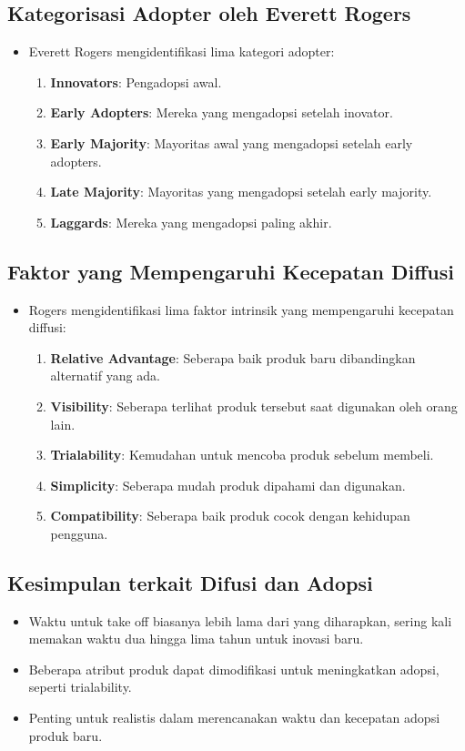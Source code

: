 \documentclass{article}
\begin{document}
\subsection{Kategorisasi Adopter oleh Everett Rogers}
\begin{itemize}
    \item Everett Rogers mengidentifikasi lima kategori adopter:
          \begin{enumerate}
              \item \textbf{Innovators}: Pengadopsi awal.
              \item \textbf{Early Adopters}: Mereka yang mengadopsi setelah inovator.
              \item \textbf{Early Majority}: Mayoritas awal yang mengadopsi setelah early adopters.
              \item \textbf{Late Majority}: Mayoritas yang mengadopsi setelah early majority.
              \item \textbf{Laggards}: Mereka yang mengadopsi paling akhir.
          \end{enumerate}
\end{itemize}

\subsection{Faktor yang Mempengaruhi Kecepatan Diffusi}
\begin{itemize}
    \item Rogers mengidentifikasi lima faktor intrinsik yang mempengaruhi kecepatan diffusi:
          \begin{enumerate}
              \item \textbf{Relative Advantage}: Seberapa baik produk baru dibandingkan alternatif yang ada.
              \item \textbf{Visibility}: Seberapa terlihat produk tersebut saat digunakan oleh orang lain.
              \item \textbf{Trialability}: Kemudahan untuk mencoba produk sebelum membeli.
              \item \textbf{Simplicity}: Seberapa mudah produk dipahami dan digunakan.
              \item \textbf{Compatibility}: Seberapa baik produk cocok dengan kehidupan pengguna.
          \end{enumerate}
\end{itemize}

\subsection{Kesimpulan terkait Difusi dan Adopsi}
\begin{itemize}
    \item Waktu untuk take off biasanya lebih lama dari yang diharapkan, sering kali memakan waktu dua hingga lima tahun untuk inovasi baru.
    \item Beberapa atribut produk dapat dimodifikasi untuk meningkatkan adopsi, seperti trialability.
    \item Penting untuk realistis dalam merencanakan waktu dan kecepatan adopsi produk baru.
\end{itemize}
\end{document}
